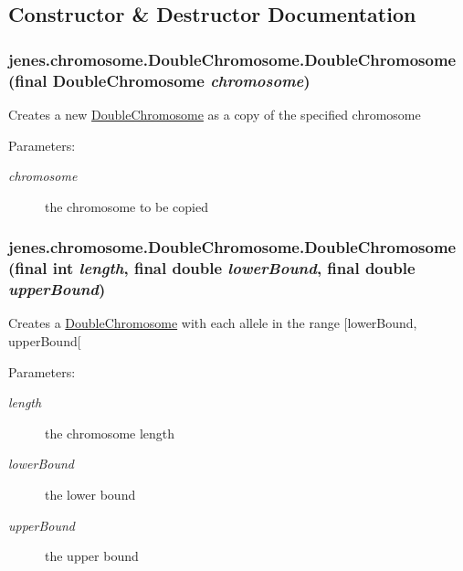 \subsection{Constructor \& Destructor Documentation}
\hypertarget{classjenes_1_1chromosome_1_1_double_chromosome_849079d41a2f10db681ba24de10d2619}{
\subsubsection[DoubleChromosome]{\setlength{\rightskip}{0pt plus 5cm}jenes.chromosome.DoubleChromosome.DoubleChromosome (final {\bf DoubleChromosome} {\em chromosome})}}
\label{classjenes_1_1chromosome_1_1_double_chromosome_849079d41a2f10db681ba24de10d2619}


Creates a new \hyperlink{classjenes_1_1chromosome_1_1_double_chromosome}{DoubleChromosome} as a copy of the specified chromosome 

\begin{Desc}
\item[Parameters:]
\begin{description}
\item[{\em chromosome}]the chromosome to be copied \end{description}
\end{Desc}
\hypertarget{classjenes_1_1chromosome_1_1_double_chromosome_7166da8f71e5b0cf37e751c053f6ff5f}{
\subsubsection[DoubleChromosome]{\setlength{\rightskip}{0pt plus 5cm}jenes.chromosome.DoubleChromosome.DoubleChromosome (final int {\em length}, \/  final double {\em lowerBound}, \/  final double {\em upperBound})}}
\label{classjenes_1_1chromosome_1_1_double_chromosome_7166da8f71e5b0cf37e751c053f6ff5f}


Creates a \hyperlink{classjenes_1_1chromosome_1_1_double_chromosome}{DoubleChromosome} with each allele in the range \mbox{[}lowerBound, upperBound\mbox{[} 

\begin{Desc}
\item[Parameters:]
\begin{description}
\item[{\em length}]the chromosome length \item[{\em lowerBound}]the lower bound \item[{\em upperBound}]the upper bound \end{description}
\end{Desc}


